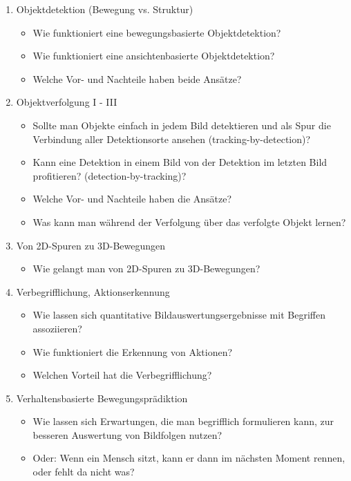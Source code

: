 \documentclass{report}
\begin{document}
\begin{itemize}
\begin{enumerate}
			\item Objektdetektion (Bewegung vs. Struktur)
			\begin{itemize}
				\item Wie funktioniert eine bewegungsbasierte Objektdetektion?
				\item Wie funktioniert eine ansichtenbasierte Objektdetektion?
				\item Welche Vor- und Nachteile haben beide Ansätze?
			\end{itemize}
		
			\item Objektverfolgung I - III
			\begin{itemize}
				\item Sollte man Objekte einfach in jedem Bild
				detektieren und als Spur die Verbindung aller
				Detektionsorte ansehen
				(tracking-by-detection)?
				\item Kann eine Detektion in einem Bild von der
				Detektion im letzten Bild profitieren?
				(detection-by-tracking)?
				\item Welche Vor- und Nachteile haben die Ansätze?
				\item Was kann man während der Verfolgung über
				das verfolgte Objekt lernen?
			\end{itemize}
		
			\item Von 2D-Spuren zu 3D-Bewegungen
			\begin{itemize}
				\item Wie gelangt man von 2D-Spuren zu 3D-Bewegungen?
			\end{itemize}
		
			\item Verbegrifflichung, Aktionserkennung
			\begin{itemize}
				\item Wie lassen sich quantitative Bildauswertungsergebnisse mit Begriffen assoziieren?
				\item Wie funktioniert die Erkennung von Aktionen?
				\item Welchen Vorteil hat die Verbegrifflichung?
			\end{itemize}
		
			\item Verhaltensbasierte Bewegungsprädiktion
			\begin{itemize}
				\item Wie lassen sich Erwartungen, die man begrifflich formulieren kann, zur besseren
				Auswertung von Bildfolgen nutzen?
				\item Oder: Wenn ein Mensch sitzt, kann er dann im nächsten Moment rennen, oder fehlt
				da nicht was?
			\end{itemize}
		
		\end{enumerate}
		
		
	\end{itemize}
	\newpage
\end{document}
